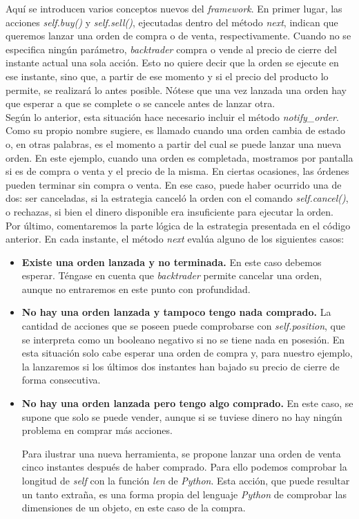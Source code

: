 		Aqu\'i se introducen varios conceptos nuevos del \textit{framework}. En primer lugar, las acciones \textit{self.buy()} y \textit{self.sell()}, ejecutadas dentro del m\'etodo \textit{next}, indican que queremos lanzar una orden de compra o de venta, respectivamente. Cuando no se especifica ning\'un par\'ametro, \textit{backtrader} compra o vende al precio de cierre del instante actual una sola acci\'on. Esto no quiere decir que la orden se ejecute en ese instante, sino que, a partir de ese momento y si el precio del producto lo permite, se realizar\'a lo antes posible. N\'otese que una vez lanzada una orden hay que esperar a que se complete o se cancele antes de lanzar otra.\\
		
		Seg\'un lo anterior, esta situaci\'on hace necesario incluir el m\'etodo \textit{notify\_order}. Como su propio nombre sugiere, es llamado cuando una orden cambia de estado o, en otras palabras, es el momento a partir del cual se puede lanzar una nueva orden. En este ejemplo, cuando una orden es completada, mostramos por pantalla si es de compra o venta y el precio de la misma. En ciertas ocasiones, las \'ordenes pueden terminar sin compra o venta. En ese caso, puede haber ocurrido una de dos: ser canceladas, si la estrategia cancel\'o la orden con el comando \textit{self.cancel()}, o rechazas, si bien el dinero disponible era insuficiente para ejecutar la orden.\\
		
		Por \'ultimo, comentaremos la parte l\'ogica de la estrategia presentada en el c\'odigo anterior. En cada instante, el m\'etodo \textit{next} eval\'ua alguno de los siguientes casos:
		
		\begin{itemize}
			\item \textbf{Existe una orden lanzada y no terminada.} En este caso debemos esperar. T\'engase en cuenta que \textit{backtrader} permite cancelar una orden, aunque no entraremos en este punto con profundidad.
			\item \textbf{No hay una orden lanzada y tampoco tengo nada comprado.} La cantidad de acciones que se poseen puede comprobarse con \textit{self.position}, que se interpreta como un booleano negativo si no se tiene nada en posesi\'on. En esta situaci\'on solo cabe esperar una orden de compra y, para nuestro ejemplo, la lanzaremos si los \'ultimos dos instantes han bajado su precio de cierre de forma consecutiva.
			\item \textbf{No hay una orden lanzada pero tengo algo comprado.} En este caso, se supone que solo se puede vender, aunque si se tuviese dinero no hay ning\'un problema en comprar m\'as acciones.
			
			 Para ilustrar una nueva herramienta, se propone lanzar una orden de venta cinco instantes despu\'es de haber comprado. Para ello podemos comprobar la longitud de \textit{self} con la funci\'on \textit{len} de \textit{Python}. Esta acci\'on, que puede resultar un tanto extra\~na, es una forma propia del lenguaje \textit{Python} de comprobar las dimensiones de un objeto, en este caso de la compra.
		\end{itemize}
		
